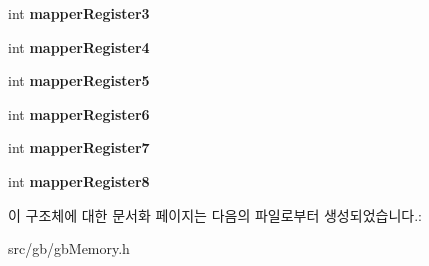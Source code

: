 \begin{DoxyCompactItemize}
int {\bfseries mapper\+Register3}
\item 
\mbox{\label{structmapper_hu_c3_abbd3e6768218879289e081bfe61085a0}} 
int {\bfseries mapper\+Register4}
\item 
\mbox{\label{structmapper_hu_c3_ad72bed2f2b497e68ff30c70f8105c03a}} 
int {\bfseries mapper\+Register5}
\item 
\mbox{\label{structmapper_hu_c3_a5dace14f152956810d188d6b08ca0739}} 
int {\bfseries mapper\+Register6}
\item 
\mbox{\label{structmapper_hu_c3_a3d611f8b421806dd7b684dc6c6859107}} 
int {\bfseries mapper\+Register7}
\item 
\mbox{\label{structmapper_hu_c3_a7a22f2e1258e8b5c86e359ffd54eef85}} 
int {\bfseries mapper\+Register8}
\end{DoxyCompactItemize}


이 구조체에 대한 문서화 페이지는 다음의 파일로부터 생성되었습니다.\+:\begin{DoxyCompactItemize}
\item 
src/gb/gb\+Memory.\+h\end{DoxyCompactItemize}
